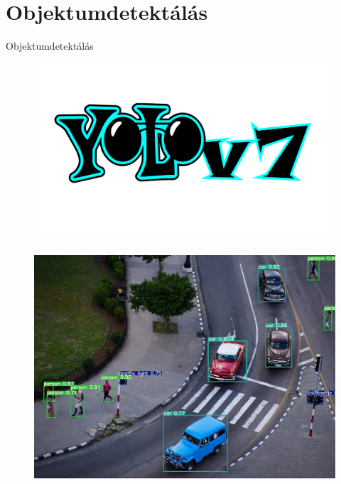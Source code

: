 \documentclass{beamer}
\begin{document}
\section{Objektumdetektálás}
\begin{frame}{Objektumdetektálás}
    \begin{figure}
        \includegraphics[scale=0.07]{yolo_logo.png}
    \end{figure}
    \begin{columns}
        \centering
        \begin{figure}
            \includegraphics[scale=0.1]{yolo_img.jpg} 
        \end{figure}


\end{columns}
\end{frame}
\end{document}

